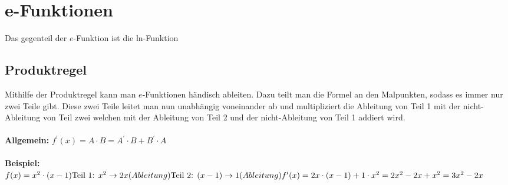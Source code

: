 \section{e-Funktionen}

Das gegenteil der $e$-Funktion ist die ln-Funktion

\subsection{Produktregel}
Mithilfe der Produktregel kann man $e$-Funktionen händisch ableiten. Dazu teilt man die Formel an den Malpunkten, sodass es immer nur zwei Teile gibt. Diese zwei Teile leitet man nun unabhängig voneinander ab und multipliziert die Ableitung von Teil 1 mit der nicht-Ableitung von Teil zwei welchen mit der Ableitung von Teil 2 und der nicht-Ableitung von Teil 1 addiert wird.
\\
\\
\textbf{Allgemein:} $f^{\prime}(x) = A \cdot B = A^{\prime} \cdot B  + B^{\prime} \cdot A$
\\
\\
\textbf{Beispiel:}
\\
$
f(x) = x^{2} \cdot (x-1)
\\
\text{Teil 1: }x^{2} \rightarrow 2x (Ableitung)
\\
\text{Teil 2: }(x-1) \rightarrow 1 (Ableitung)
\\
f^{\prime}(x) = 2x \cdot (x-1) + 1 \cdot x^{2} \\
= 2x^{2}-2x + x^{2} \\
= 3x^{2}-2x
$